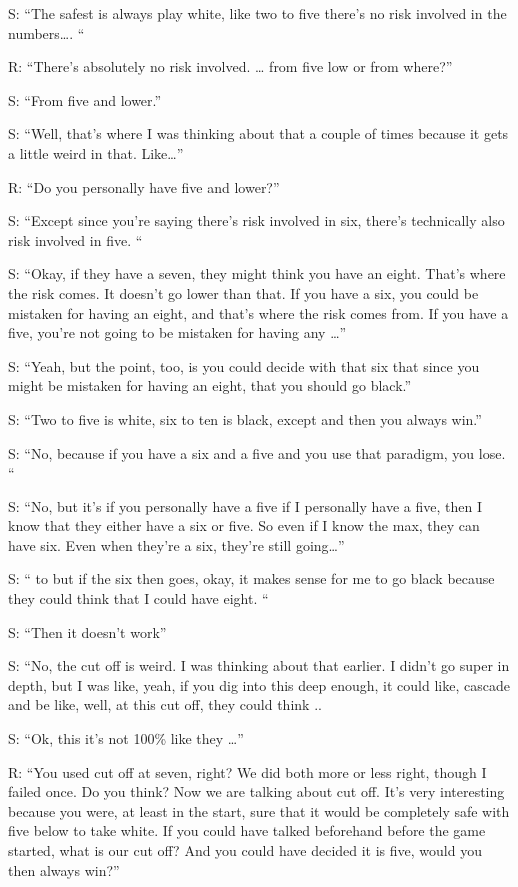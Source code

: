 S: “The safest is always play white, like two to five there's no risk involved in the numbers…. “ %

R: “There's absolutely no risk involved. … from five low or from where?”

S: “From five and lower.”

S: “Well, that's where I was thinking about that a couple of times because it gets a little weird in that. Like…”

R: “Do you personally have five and lower?”

S: “Except since you're saying there's risk involved in six, there's technically also risk involved in five. “

S: “Okay, if they have a seven, they might think you have an eight. That's where the risk comes. It doesn't go lower than that. If you have a six, you could be mistaken for having an eight, and that's where the risk comes from. If you have a five, you're not going to be mistaken for having any …”

S: “Yeah, but the point, too, is you could decide with that six that since you might be mistaken for having an eight, that you should go black.”

S: “Two to five is white, six to ten is black, except and then you always win.”

S: “No, because if you have a six and a five and you use that paradigm, you lose. “

S: “No, but it's if you personally have a five if I personally have a five, then I know that they either have a six or five. So even if I know the max, they can have six. Even when they're a six, they're still going…”

S: “ to but if the six then goes, okay, it makes sense for me to go black because they could think that I could have eight. “

S: “Then it doesn't work”

S: “No, the cut off is weird. I was thinking about that earlier. I didn't go super in depth, but I was like, yeah, if you dig into this deep enough, it could like, cascade and be like, well, at this cut off, they could think ..

S: “Ok, this it's not 100\% like they …”

R: “You used cut off at seven, right? We did both more or less right, though I failed once. Do you think? Now we are talking about cut off. It's very interesting because you were, at least in the start, sure that it would be completely safe with five below to take white. If you could have talked beforehand before the game started, what is our cut off? And you could have decided it is five, would you then always win?” 

